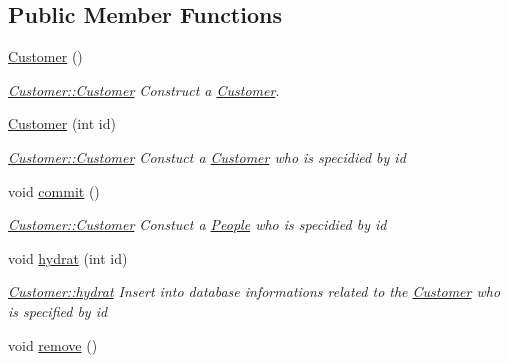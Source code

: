 \subsection*{Public Member Functions}
\begin{DoxyCompactItemize}
\item 
\hypertarget{classModels_1_1Customer_a28e8ade7d9ccc39707f823ba8d45f7d0}{\hyperlink{classModels_1_1Customer_a28e8ade7d9ccc39707f823ba8d45f7d0}{Customer} ()}\label{classModels_1_1Customer_a28e8ade7d9ccc39707f823ba8d45f7d0}

\begin{DoxyCompactList}\small\item\em \hyperlink{classModels_1_1Customer_a28e8ade7d9ccc39707f823ba8d45f7d0}{Customer\-::\-Customer} Construct a \hyperlink{classModels_1_1Customer}{Customer}. \end{DoxyCompactList}\item 
\hyperlink{classModels_1_1Customer_a02a1aee507d4ff4f60019070793fe604}{Customer} (int id)
\begin{DoxyCompactList}\small\item\em \hyperlink{classModels_1_1Customer_a28e8ade7d9ccc39707f823ba8d45f7d0}{Customer\-::\-Customer} Constuct a \hyperlink{classModels_1_1Customer}{Customer} who is specidied by {\itshape id} \end{DoxyCompactList}\item 
void \hyperlink{classModels_1_1Customer_af5c0f2b6d80ad9e6bcbfe39b697d65c4}{commit} ()
\begin{DoxyCompactList}\small\item\em \hyperlink{classModels_1_1Customer_a28e8ade7d9ccc39707f823ba8d45f7d0}{Customer\-::\-Customer} Constuct a \hyperlink{classModels_1_1People}{People} who is specidied by {\itshape id} \end{DoxyCompactList}\item 
void \hyperlink{classModels_1_1Customer_afe3ed7fb893d61ea6f4d14e73779382c}{hydrat} (int id)
\begin{DoxyCompactList}\small\item\em \hyperlink{classModels_1_1Customer_afe3ed7fb893d61ea6f4d14e73779382c}{Customer\-::hydrat} Insert into database informations related to the \hyperlink{classModels_1_1Customer}{Customer} who is specified by {\itshape id} \end{DoxyCompactList}\item 
\hypertarget{classModels_1_1Customer_a0f5dba0d90af0adf5d0aca26195d21b1}{void \hyperlink{classModels_1_1Customer_a0f5dba0d90af0adf5d0aca26195d21b1}{remove} ()}\label{classModels_1_1Customer_a0f5dba0d90af0adf5d0aca26195d21b1}


\end{DoxyCompactItemize}
